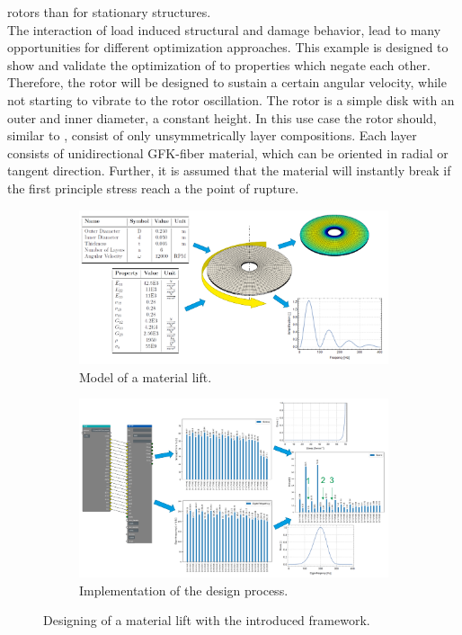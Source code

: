 rotors than for stationary structures.\cite{filippatos_damage_2017}\\
The interaction of load induced structural and damage behavior, lead to many opportunities for different optimization approaches. 
This example is designed to show and validate the optimization of to properties which negate each other.
Therefore, the rotor will be designed to sustain a certain angular velocity, while not starting to vibrate to the rotor oscillation.
The rotor is a simple disk with an outer and inner diameter, a constant height.
In this use case the rotor should, similar to \cite{filippatos_untersuchung_2018}, consist of only unsymmetrically layer compositions.
Each layer consists of unidirectional GFK-fiber material,
which can be oriented in radial or tangent direction.
Further, it is assumed that the material will instantly break if the first principle stress reach a the point of rupture.
\begin{figure}[h]
    \centering
    \begin{subfigure}[b]{0.45\textwidth}
        \centering
        \includegraphics[width=\textwidth]{pics/rotor_model.png}
        \caption{\label{pic:rotor_model} Model of a material lift.}
    \end{subfigure}
    \hfill
    \begin{subfigure}[b]{0.5\textwidth}
        \centering
        \includegraphics[width=\textwidth]{pics/rotor_solution.png}
        \caption{\label{pic:rotor_solution} Implementation of the design process.}
    \end{subfigure}
    \caption{\label{pic:rotor} Designing of a material lift with the introduced framework.}
\end{figure}\\
